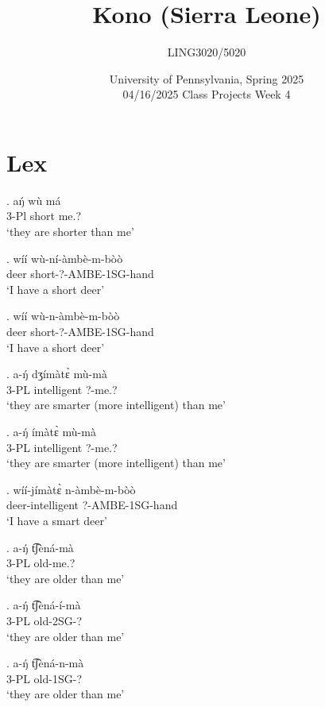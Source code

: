 \documentclass{assets/fieldnotes}
\title{Kono (Sierra Leone)}
\author{LING3020/5020}
\date{University of Pennsylvania, Spring 2025\\04/16/2025 Class Projects Week 4}
\begin{document}
\maketitle

\maketitle
\tableofcontents

\section{Lex}
\exg. aŋ́ wù má\\
3-Pl short me.?\\
`they are shorter than me' 


\exg. wíí wù-ní-àmbè-m-bòò\\
deer short-?-AMBE-1SG-hand\\
`I have a short deer' 

\exg. wíí   wù-n-àmbè-m-bòò\\
      deer  short-?-AMBE-1SG-hand\\
`I have a short deer'

\exg. a-ŋ́ dʒímàtɛ̀ mù-mà\\
3-PL intelligent ?-me.?\\
`they are smarter (more intelligent) than me' 

\exg. a-ŋ́ ímàtɛ̀  mù-mà\\
3-PL intelligent ?-me.?\\
`they are smarter (more intelligent) than me' 

\exg. wíí-jímàtɛ̀ n-àmbè-m-bòò\\
deer-intelligent ?-AMBE-1SG-hand\\
`I have a smart deer'

\exg. a-ŋ́ t͡ʃèná-mà\\
3-PL old-me.?\\
`they are older than me'

\exg. a-ŋ́ t͡ʃèná-í-mà\\
3-PL old-2SG-?\\
`they are older than me'

\exg. a-ŋ́ t͡ʃèná-n-mà\\
3-PL old-1SG-?\\
`they are older than me'

\end{document}
